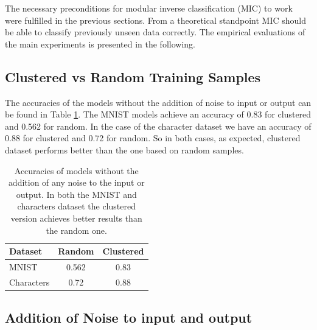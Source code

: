 \documentclass{article}
\begin{document}
The necessary preconditions for modular inverse classification (MIC) to work were fulfilled in the previous sections. From a theoretical standpoint MIC should be able to classify previously unseen data correctly. The empirical evaluations of the main experiments is presented in the following. 

\subsection{Clustered vs Random Training Samples}
\label{subsec:clustered_vs_random_results}

The accuracies of the models without the addition of noise to input or output can be found in Table \ref{table:clustered_vs_random_results}. The MNIST models achieve an accuracy of 0.83 for clustered and 0.562 for random. In the case of the character dataset we have an accuracy of 0.88 for clustered and 0.72 for random. So in both cases, as expected, clustered dataset performs better than the one based on random samples.

\begin{table}[!htb]
	\centering
	\caption{Accuracies of models without the addition of any noise to the input or output. In both the MNIST and characters dataset the clustered version achieves better results than the random one.}
	\begin{tabular}{l | cc}
		\toprule
		Dataset & Random & Clustered \\
		\midrule
		MNIST & 0.562 & 0.83\\
		Characters & 0.72 & 0.88\\
		\bottomrule
	\end{tabular}
	\label{table:clustered_vs_random_results}
\end{table}


\subsection{Addition of Noise to input and output}
\end{document}
